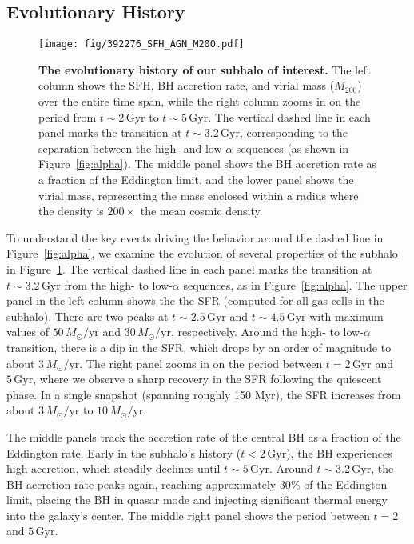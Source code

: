 \documentclass[twocolumn]{aastex631}
\newcommand{\Msun}{\ensuremath{M_{\odot}}}
\newcommand{\Gyr}{\ensuremath{\textrm{Gyr}}}
\begin{document}
\subsection{Evolutionary History}\label{ssec:evol}
\begin{figure}
  \centering
  \texttt{[image: fig/392276\_SFH\_AGN\_M200.pdf]}
  \caption{\textbf{The evolutionary history of our subhalo of interest.} The left column shows the SFH, BH accretion rate, and virial mass ($M_{200}$) over the entire time span, while the right column zooms in on the period from $t\sim2\,\Gyr$ to $t\sim5\,\Gyr$. The vertical dashed line in each panel marks the transition at $t\sim3.2\,\Gyr$, corresponding to the separation between the high- and low-$\alpha$ sequences (as shown in Figure~\ref{fig:alpha}). The middle panel shows the BH accretion rate as a fraction of the Eddington limit, and the lower panel shows the virial mass, representing the mass enclosed within a radius where the density is $200\times$ the mean cosmic density.}
  \label{fig:history}
\end{figure}

To understand the key events driving the behavior around the dashed line in Figure~\ref{fig:alpha}, we examine the evolution of several properties of the subhalo in Figure~\ref{fig:history}. The vertical dashed line in each panel marks the transition at $t\sim3.2\,\Gyr$ from the high- to low-$\alpha$ sequences, as in Figure~\ref{fig:alpha}. The upper panel in the left column shows the the SFR (computed for all gas cells in the subhalo). There are two peaks at $t\sim2.5\,\Gyr$ and $t\sim4.5\,\Gyr$ with maximum values of $50\,\Msun/\textrm{yr}$ and $30\,\Msun/\textrm{yr}$, respectively. Around the high- to low-$\alpha$ transition, there is a dip in the SFR, which drops by an order of magnitude to about $3\,\Msun/\textrm{yr}$. The right panel zooms in on the period between $t=2\,\Gyr$ and $5\,\Gyr$, where we observe a sharp recovery in the SFR following the quiescent phase. In a single snapshot (spanning roughly 150 Myr), the SFR increases from about $3\,\Msun/\textrm{yr}$ to $10\,\Msun/\textrm{yr}$.

The middle panels track the accretion rate of the central BH as a fraction of the Eddington rate. Early in the subhalo's history ($t<2\,\Gyr$), the BH experiences high accretion, which steadily declines until $t\sim5\,\Gyr$. Around $t\sim3.2\,\Gyr$, the BH accretion rate peaks again, reaching approximately $30\%$ of the Eddington limit, placing the BH in quasar mode and injecting significant thermal energy into the galaxy's center. The middle right panel shows the period between $t=2$ and $5\,\Gyr$.
\end{document}
